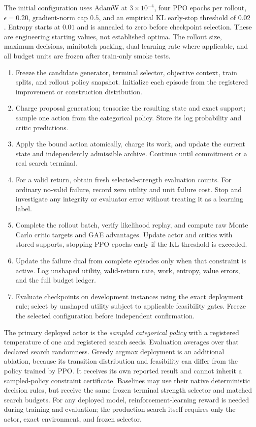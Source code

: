 \documentclass[11pt,a4paper]{article}
\theoremstyle{definition}\newtheorem{definition}[proposition]{Definition}
\begin{document}
The initial configuration uses AdamW at \(3\times10^{-4}\), four PPO epochs per rollout,
\(\epsilon=0.20\), gradient-norm cap \(0.5\), and an empirical KL early-stop threshold of
\(0.02\). Entropy starts at \(0.01\) and is annealed to zero before checkpoint selection. These
are engineering starting values, not established optima. The rollout size, maximum decisions,
minibatch packing, dual learning rate where applicable, and all budget units are frozen after
train-only smoke tests.

\begin{enumerate}
 \item Freeze the candidate generator, terminal selector, objective context, train splits, and
       rollout policy snapshot. Initialize each episode from the registered improvement or
       construction distribution.
 \item Charge proposal generation; tensorize the resulting state and exact support; sample one
       action from the categorical policy. Store its log probability and critic predictions.
 \item Apply the bound action atomically, charge its work, and update the current state and
       independently admissible archive. Continue until commitment or a real search terminal.
 \item For a valid return, obtain fresh selected-strength evaluation counts. For ordinary
       no-valid failure, record zero utility and unit failure cost. Stop and investigate any
       integrity or evaluator error without treating it as a learning label.
 \item Complete the rollout batch, verify likelihood replay, and compute raw Monte Carlo critic
       targets and GAE advantages. Update actor and critics with stored supports, stopping PPO
       epochs early if the KL threshold is exceeded.
 \item Update the failure dual from complete episodes only when that constraint is active. Log
       unshaped utility, valid-return rate, work, entropy, value errors, and the full budget ledger.
 \item Evaluate checkpoints on development instances using the exact deployment rule; select by
       unshaped utility subject to applicable feasibility gates. Freeze the selected configuration
       before independent confirmation.
\end{enumerate}

The primary deployed actor is the \emph{sampled categorical policy} with a registered temperature
of one and registered search seeds. Evaluation averages over that declared search randomness.
Greedy argmax deployment is an additional ablation, because its transition distribution and
feasibility can differ from the policy trained by PPO. It receives its own reported result and
cannot inherit a sampled-policy constraint certificate. Baselines may use their native deterministic
decision rules, but receive the same frozen terminal strength selector and matched search budgets.
For any deployed model, reinforcement-learning reward is needed during training and evaluation;
the production search itself requires only the actor, exact environment, and frozen selector.
\end{document}
